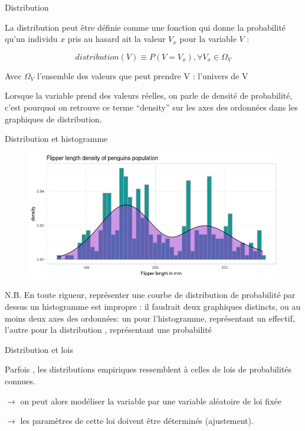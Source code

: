 \documentclass{beamer}
\begin{document}
\begin{frame}{Distribution}





La distribution peut être définie comme une \alert{fonction} qui donne la probabilité qu’un individu $x$ pris au hasard  ait la valeur $V_x$ pour la variable $V$ : 

$$distribution(V) \equiv P(V=V_x),\forall V_x \in \Omega_V$$ 

Avec $\Omega_V$  l’ensemble des valeurs que peut prendre V : l’univers de V

Lorsque la variable prend des valeurs réelles, on parle de \alert{densité de probabilité}, c’est pourquoi on retrouve ce terme “density” sur les axes des ordonnées dans les graphiques de distribution.


\end{frame}

\begin{frame}{Distribution et histogramme}

\begin{figure}
  \centering
     \includegraphics[width=.7\linewidth]{img/histo_dens.png}
\end{figure}

\begin{small}
\begin{spacing}{0.75}
\alert{N.B.} En toute rigueur, représenter une courbe de distribution de probabilité par dessus un histogramme est impropre : il faudrait deux graphiques distincts, ou au moins deux axes des ordonnées: un pour l’histogramme, représentant un effectif, l’autre pour la distribution , représentant une probabilité 
\end{spacing}
\end{small}

\end{frame}





\begin{frame}{Distribution et lois}

Parfois , les distributions empiriques ressemblent à celles de lois de probabilités connues. 

$\rightarrow$ on peut alors  \alert{modéliser}  la  variable par une variable aléatoire de loi fixée

$\rightarrow$ les paramètres de cette loi doivent être déterminés (ajustement).


\end{frame}
\end{document}
